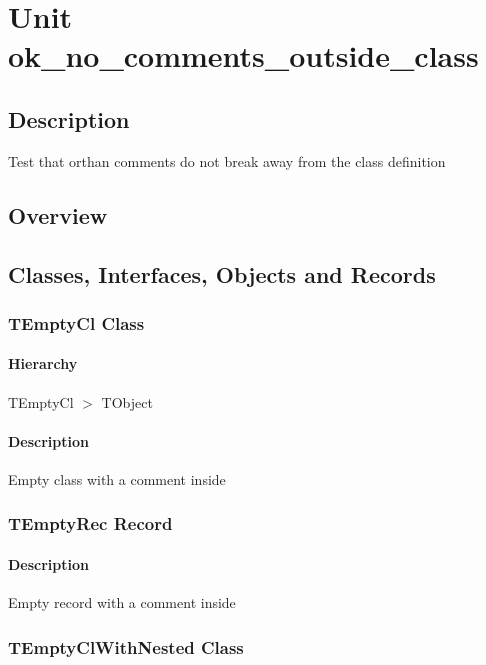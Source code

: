 \documentclass{report}
\begin{document}
\newlength{\tmplength}
\chapter{Unit ok{\_}no{\_}comments{\_}outside{\_}class}
\section{Description}
Test that orthan comments do not break away from the class definition
\section{Overview}
\begin{description}
\item[\texttt{\begin{ttfamily}TEmptyCl\end{ttfamily} Class}]
\item[\texttt{\begin{ttfamily}TEmptyRec\end{ttfamily} Record}]
\item[\texttt{\begin{ttfamily}TEmptyClWithNested\end{ttfamily} Class}]
\end{description}
\section{Classes, Interfaces, Objects and Records}
\subsection*{TEmptyCl Class}
\subsubsection*{\large{\textbf{Hierarchy}}\normalsize\hspace{1ex}\hfill}
TEmptyCl {$>$} TObject
\subsubsection*{\large{\textbf{Description}}\normalsize\hspace{1ex}\hfill}
Empty class with a comment inside\subsection*{TEmptyRec Record}
\subsubsection*{\large{\textbf{Description}}\normalsize\hspace{1ex}\hfill}
Empty record with a comment inside\subsection*{TEmptyClWithNested Class}
\end{document}
